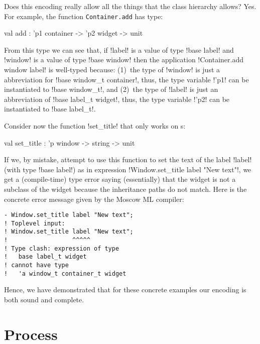 \documentclass[finalversion]{usetex-v1}
\begin{document}
Does this encoding really allow all the things that the class
hierarchy allows?  Yes. For example, the function
\texttt{Container.add} has type:
\begin{SMLcode}
val add : 'p1 container -> 'p2 widget 
                                 -> unit
\end{SMLcode}
From this type we can see that, if !label! is a value of type 
%
!base label! 
% 
and !window! is a value of type !base window! then
the application
%
!Container.add window label!
%
is well-typed because: (1)~the type of !window! is just a abbreviation for 
%
!base window_t container!,
%
thus, the type variable !'p1! can be instantiated to 
%
!base window_t!,
% 
and (2)~the type of !label! is just an abbreviation of 
%
!base label_t widget!,
%
thus, the type variable !'p2! can be instantiated to 
%
!base label_t!.

Consider now the function !set_title! that only works on s:
\begin{SMLcode}
val set_title : 'p window -> string -> unit
\end{SMLcode}
If we, by mistake, attempt to use this function to set the text of the
label !label! (with type !base label!) as in expression
%
!Window.set_title label "New text"!, 
%
we get a (compile-time) type error saying (essentially) that the
 widget is not a subclass of the 
widget because the inheritance paths do not match.  Here is the
concrete error message given by the Moscow ML compiler:
\begin{verbatim}
- Window.set_title label "New text";
! Toplevel input:
! Window.set_title label "New text";
!                  ^^^^^
! Type clash: expression of type
!   base label_t widget
! cannot have type
!   'a window_t container_t widget
\end{verbatim}

Hence, we have demonstrated that for these concrete
examples our encoding is both sound and complete.




\section{Process}
\label{sec:process}
\end{document}
